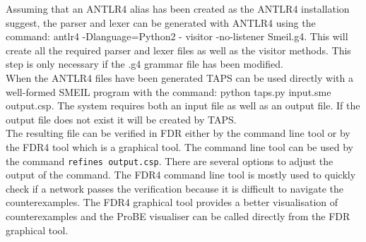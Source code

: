 Assuming that an ANTLR4 alias has been created as the ANTLR4 installation suggest, the parser and lexer can be generated with ANTLR4 using the command: {\ttfamily antlr4 -Dlanguage=Python2 - visitor -no-listener Smeil.g4.}
This will create all the required parser and lexer files as well as the visitor methods. This step is only necessary if the .g4 grammar file has been modified.\\

When the ANTLR4 files have been generated TAPS can be used directly with a well-formed SMEIL program with the command: {\ttfamily python taps.py input.sme output.csp}. The system requires both an input file as well as an output file. If the output file does not exist it will be created by TAPS. \\

The resulting \cspm{} file can be verified in FDR either by the command line tool or by the FDR4 tool which is a graphical tool. The command line tool can be used by the command \texttt{refines output.csp}. There are several options to adjust the output of the command. The FDR4 command line tool is mostly used to quickly check if a network passes the verification because it is difficult to navigate the counterexamples. The FDR4 graphical tool provides a better visualisation of counterexamples and the ProBE visualiser can be called directly from the FDR graphical tool.

